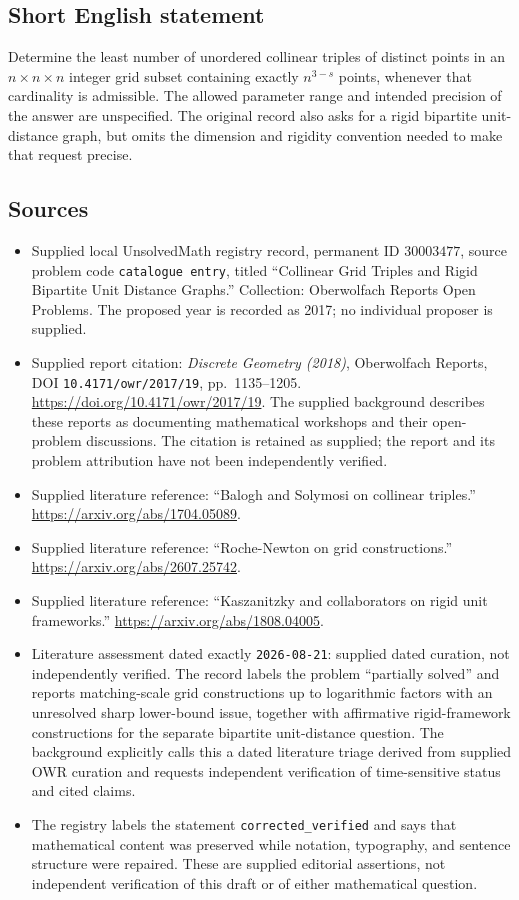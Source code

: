 \documentclass[11pt]{article}
\begin{document}
\subsection{Short English statement}
Determine the least number of unordered collinear triples of distinct points in an \(n\times n\times n\) integer grid subset containing exactly \(n^{3-s}\) points, whenever that cardinality is admissible. The allowed parameter range and intended precision of the answer are unspecified. The original record also asks for a rigid bipartite unit-distance graph, but omits the dimension and rigidity convention needed to make that request precise.
\subsection{Sources}
\begin{itemize}
\item Supplied local UnsolvedMath registry record, permanent ID \(30003477\), source problem code \texttt{catalogue entry}, titled ``Collinear Grid Triples and Rigid Bipartite Unit Distance Graphs.'' Collection: Oberwolfach Reports Open Problems. The proposed year is recorded as 2017; no individual proposer is supplied.
\item Supplied report citation: \emph{Discrete Geometry (2018)}, Oberwolfach Reports, DOI \texttt{10.4171/owr/2017/19}, pp.~1135--1205. \url{https://doi.org/10.4171/owr/2017/19}. The supplied background describes these reports as documenting mathematical workshops and their open-problem discussions. The citation is retained as supplied; the report and its problem attribution have not been independently verified.
\item Supplied literature reference: ``Balogh and Solymosi on collinear triples.'' \url{https://arxiv.org/abs/1704.05089}.
\item Supplied literature reference: ``Roche-Newton on grid constructions.'' \url{https://arxiv.org/abs/2607.25742}.
\item Supplied literature reference: ``Kaszanitzky and collaborators on rigid unit frameworks.'' \url{https://arxiv.org/abs/1808.04005}.
\item Literature assessment dated exactly \texttt{2026-08-21}: supplied dated curation, not independently verified. The record labels the problem ``partially solved'' and reports matching-scale grid constructions up to logarithmic factors with an unresolved sharp lower-bound issue, together with affirmative rigid-framework constructions for the separate bipartite unit-distance question. The background explicitly calls this a dated literature triage derived from supplied OWR curation and requests independent verification of time-sensitive status and cited claims.
\item The registry labels the statement \texttt{corrected\_verified} and says that mathematical content was preserved while notation, typography, and sentence structure were repaired. These are supplied editorial assertions, not independent verification of this draft or of either mathematical question.
\end{itemize}
\end{document}
